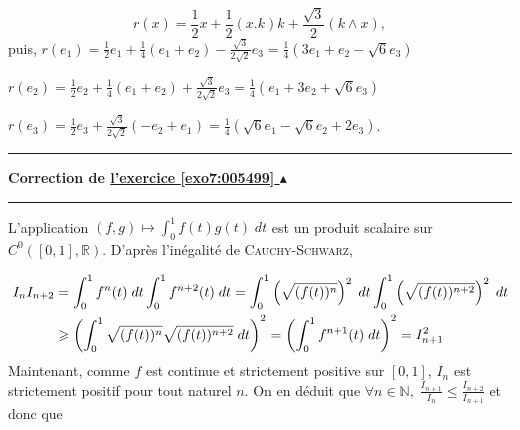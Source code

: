 \documentclass[11pt,a4paper]{article}
\newcommand{\Nn}{\mathbb{N}} \newcommand{\N}{\mathbb{N}}
\newcommand{\Rr}{\mathbb{R}} \newcommand{\R}{\mathbb{R}}
\newcounter{exo}
\newcommand{\correction}[1]{\hypertarget{cor7:#1}{}\label{cor7:#1}{\bf Correction de \hyperlink{exo7:#1}{l'exercice \ref{exo7:#1} $\blacktriangle$}}\vspace{1mm}\hrule\vspace{1mm}}
\newcommand{\fincorrection}{\vspace{1mm}\hrule\vspace*{7mm}}
\begin{document}
$$r(x)=\frac{1}{2}x+\frac{1}{2}(x.k)k+\frac{\sqrt{3}}{2}(k\wedge x),$$
puis,
$r(e_1)=\frac{1}{2}e_1+\frac{1}{4}(e_1+e_2)-\frac{\sqrt{3}}{2\sqrt{2}}e_3=\frac{1}{4}(3e_1+e_2-\sqrt{6}e_3)$

$r(e_2)=\frac{1}{2}e_2+\frac{1}{4}(e_1+e_2)+\frac{\sqrt{3}}{2\sqrt{2}}e_3=\frac{1}{4}(e_1+3e_2+\sqrt{6}e_3)$

$r(e_3)=\frac{1}{2}e_3+\frac{\sqrt{3}}{2\sqrt{2}}(-e_2+e_1)=\frac{1}{4}(\sqrt{6}e_1-\sqrt{6}e_2+2e_3)$.

\begin{center}
\end{center}
\fincorrection
\correction{005499}
L'application $(f,g)\mapsto\int_{0}^{1}f(t)g(t)\;dt$ est un produit scalaire sur $C^0([0,1],\Rr)$. D'après l'inégalité de \textsc{Cauchy}-\textsc{Schwarz},
 
\begin{align*}\ensuremath
I_nI_{n+2}&=\int_{0}^{1}f^n(t)\;dt\int_{0}^{1}f^{n+2}(t)\;dt=\int_{0}^{1}\left(\sqrt{(f(t))^n}\right)^2\;dt\int_{0}^{1}\left(\sqrt{(f(t))^{n+2}}\right)^2\;dt\\
 &\geq\left(\int_{0}^{1}\sqrt{(f(t))^n}\sqrt{(f(t))^{n+2}}\;dt\right)^2=\left(\int_{0}^{1}f^{n+1}(t)\;dt\right)^2=I_{n+1}^2
\end{align*}
Maintenant, comme $f$ est continue et strictement positive sur $[0,1]$, $I_n$ est strictement positif pour tout naturel $n$. On en déduit que $\forall n\in\Nn,\;\frac{I_{n+1}}{I_n}\leq\frac{I_{n+2}}{I_{n+1}}$ et donc que
\end{document}
